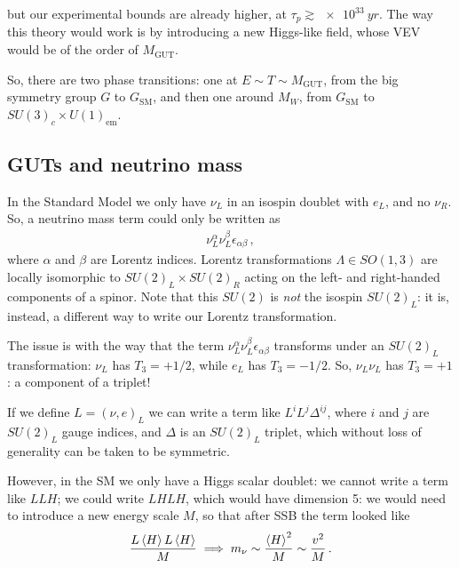 \documentclass[main.tex]{subfiles}
\begin{document}
but our experimental bounds are already higher, at \(\tau_{p} \gtrsim \SI{e33}{yr}\). 
The way this theory would work is by introducing a new Higgs-like field, whose VEV would be of the order of \(M _{\text{GUT}}\). 

So, there are two phase transitions: one at \(E \sim T \sim M _{\text{GUT}}\), from the big symmetry group \(G\) to \(G _{\text{SM}}\), and then one around \(M_W\), from \(G _{\text{SM}}\) to \(SU(3)_c \times U(1) _{\text{em}}\).

\subsection{GUTs and neutrino mass}

In the Standard Model we only have \(\nu_{L}\) in an isospin doublet with \(e_L\), and no \(\nu_{R}\). 
So, a neutrino mass term could only be written as 
%
\begin{align}
\nu_{L}^{\alpha } \nu_{L}^{\beta } \epsilon_{\alpha \beta }
\,,
\end{align}
%
where \(\alpha \) and \(\beta \) are Lorentz indices. 
Lorentz transformations \(\Lambda \in SO(1, 3)\) are locally isomorphic to \(SU(2)_L \times SU(2)_R\) acting on the left- and right-handed components of a spinor. Note that this \(SU(2)\) is \emph{not} the isospin \(SU(2)_L\): it is, instead, a different way to write our Lorentz transformation. 

The issue is with the way that the term \(\nu_{L}^{\alpha } \nu_{L}^{\beta } \epsilon_{\alpha \beta } \) transforms under an \(SU(2)_L\) transformation: \(\nu_L \) has \(T_3 = + 1/2\), while \(e_L\) has \(T_3 = - 1/2\). So, \(\nu_{L } \nu_{L}\) has \(T_3 = +1\): a component of a  triplet! 

If we define \(L = (\nu , e)_L\) we can write a term like \(L^{i} L^{j} \Delta^{ij}\), where \(i\) and \(j\) are \(SU(2)_L\) gauge indices, and \(\Delta \) is an \(SU(2)_L\) triplet, which without loss of generality can be taken to be symmetric. 

However, in the SM we only have a Higgs scalar doublet: we cannot write a term like \(LLH\); we could write \(LHLH\), which would have dimension 5: we would need to introduce a new energy scale \(M\), so that after SSB the term looked like 
%
\begin{align}
\frac{L \expval{H} L \expval{H}}{M} \implies m_\nu \sim \frac{\expval{H}^2}{M} \sim \frac{v^2}{M}
\,.
\end{align}
\end{document}
